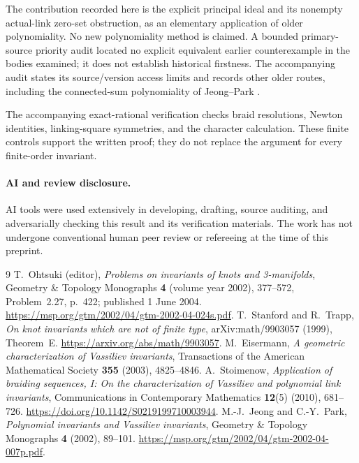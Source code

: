 \documentclass[11pt]{article}
\begin{document}
The contribution recorded here is the explicit principal ideal and its
nonempty actual-link zero-set obstruction, as an elementary application of
older polynomiality. No new polynomiality method is claimed. A bounded
primary-source priority audit located no explicit equivalent earlier
counterexample in the bodies examined; it does not establish historical
firstness. The accompanying audit states its source/version access limits
and records other older routes, including the connected-sum polynomiality
of Jeong--Park \cite{JeongPark}.

The accompanying exact-rational verification checks braid resolutions,
Newton identities, linking-square symmetries, and the character calculation.
These finite controls support the written proof; they do not replace the
argument for every finite-order invariant.

\paragraph{AI and review disclosure.}
AI tools were used extensively in developing, drafting, source auditing,
and adversarially checking this result and its verification materials.
The work has not undergone conventional human peer review or refereeing
at the time of this preprint.

\begin{thebibliography}{9}
T.~Ohtsuki (editor),
\emph{Problems on invariants of knots and 3-manifolds},
Geometry \& Topology Monographs \textbf{4} (volume year 2002), 377--572,
Problem~2.27, p.~422; published 1 June 2004.
\url{https://msp.org/gtm/2002/04/gtm-2002-04-024s.pdf}.
T.~Stanford and R.~Trapp,
\emph{On knot invariants which are not of finite type},
arXiv:math/9903057 (1999), Theorem~E.
\url{https://arxiv.org/abs/math/9903057}.
M.~Eisermann,
\emph{A geometric characterization of Vassiliev invariants},
Transactions of the American Mathematical Society
\textbf{355} (2003), 4825--4846.
A.~Stoimenow,
\emph{Application of braiding sequences, I: On the characterization of
Vassiliev and polynomial link invariants},
Communications in Contemporary Mathematics \textbf{12}(5) (2010), 681--726.
\url{https://doi.org/10.1142/S0219199710003944}.
M.-J.~Jeong and C.-Y.~Park,
\emph{Polynomial invariants and Vassiliev invariants},
Geometry \& Topology Monographs \textbf{4} (2002), 89--101.
\url{https://msp.org/gtm/2002/04/gtm-2002-04-007p.pdf}.
\end{thebibliography}
\end{document}
